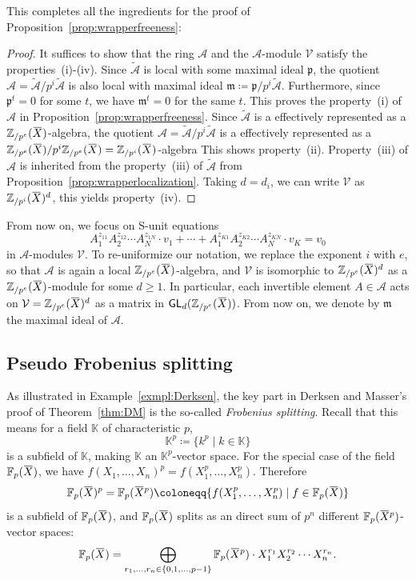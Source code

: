\documentclass[letterpaper, 11pt, thm-restate]{article}
\numberwithin{equation}{section}
\newcommand{\K}{\mathbb{K}}
\newcommand{\F}{\mathbb{F}}
\newcommand{\Zpe}{\mathbb{Z}_{/p^e}}
\newcommand{\Zpi}{\mathbb{Z}_{/p^i}}
\newcommand{\GL}{\mathsf{GL}}
\newcommand{\mV}{\mathcal{V}}
\newcommand{\mA}{\mathcal{A}}
\newcommand{\tmA}{\widetilde{\mathcal{A}}}
\newcommand{\oX}{\mkern 1.5mu\overline{\mkern-1.5mu X \mkern-1.5mu}\mkern 1.5mu}
\newcommand{\frp}{\mathfrak{p}}
\newcommand{\frm}{\mathfrak{m}}
\theoremstyle{definition}
\theoremstyle{definition}
\theoremstyle{definition}
\begin{document}
This completes all the ingredients for the proof of Proposition~\ref{prop:wrapperfreeness}:

\propwrapperfreeness*
\begin{proof}
    It suffices to show that the ring $\mA$ and the $\mA$-module $\mV$ satisfy the properties~(i)-(iv).
    Since $\tmA$ is local with some maximal ideal $\frp$, the quotient $\mA = \tmA/p^i \tmA$ is also local with maximal ideal $\frm \coloneqq \frp/p^i \tmA$.
    Furthermore, since $\frp^t = 0$ for some $t$, we have $\frm^t = 0$ for the same $t$.
    This proves the property~(i) of $\mA$ in Proposition~\ref{prop:wrapperfreeness}.
    Since $\tmA$ is a effectively represented as a $\Zpe(\oX)$-algebra, the quotient $\mA = \tmA/p^i \tmA$ is a effectively represented as a $\Zpe(\oX)/p^i\Zpe(\oX) = \Zpi(\oX)$-algebra
    This shows property~(ii).
    Property~(iii) of $\mA$ is inherited from the property~(iii) of $\tmA$ from Proposition~\ref{prop:wrapperlocalization}.
    Taking $d = d_i$, we can write $\mV$ as $\Zpi(\oX)^{d}$, this yields property~(iv).
\end{proof}

From now on, we focus on S-unit equations
\begin{equation*}
     A_1^{z_{11}} A_2^{z_{12}} \cdots A_N^{z_{1N}} \cdot v_1 + \cdots + A_1^{z_{K1}} A_2^{z_{K2}} \cdots A_N^{z_{KN}} \cdot v_K = v_0
\end{equation*}
in $\mA$-modules $\mV$.
To re-uniformize our notation, we replace the exponent $i$ with $e$, so that $\mA$ is again a local $\Zpe(\oX)$-algebra, and $\mV$ is isomorphic to $\Zpe(\oX)^d$ as a $\Zpe(\oX)$-module for some $d \geq 1$.
In particular, each invertible element $A \in \mA$ acts on $\mV = \Zpe(\oX)^d$ as a matrix in $\GL_d(\Zpe(\oX))$.
From now on, we denote by $\frm$ the maximal ideal of $\mA$.

\subsection{Pseudo Frobenius splitting}\label{subsec:Frob}
As illustrated in Example~\ref{exmpl:Derksen}, the key part in Derksen and Masser's proof of Theorem~\ref{thm:DM} is the so-called \emph{Frobenius splitting}.
Recall that this means for a field $\K$ of characteristic $p$,
\[
\K^p \coloneqq \{k^p \mid k \in \K\}
\]
is a subfield of $\K$, making $\K$ an $\K^p$-vector space.
For the special case of the field $\F_p(\oX)$, we have $f(X_1, \ldots, X_n)^p = f(X_1^p, \ldots, X_n^p)$.
Therefore
\[
\F_p(\oX)^p = \F_p(\oX^p) \coloneqq \{f(X_1^p, \ldots, X_n^p) \mid f \in \F_p(\oX)\}
\]
is a subfield of $\F_p(\oX)$, and $\F_p(\oX)$ splits as an direct sum of $p^n$ different $\F_p(\oX^p)$-vector spaces:
\begin{equation}\label{eq:splitfield}
\F_p(\oX) = \bigoplus_{r_1, \ldots, r_n \in \{0, 1, \ldots, p-1\}} \F_p(\oX^p) \cdot X_1^{r_1} X_2^{r_2} \cdots X_n^{r_n}.
\end{equation}
\end{document}
